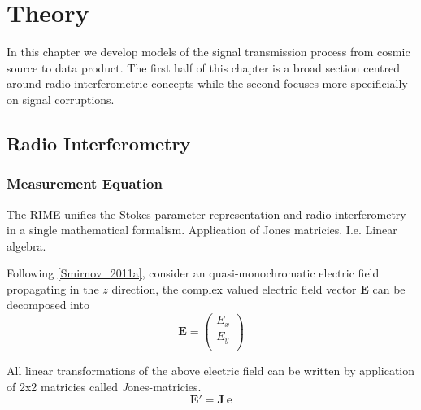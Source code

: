 \chapter{Theory}
In this chapter we develop models of the signal transmission process from cosmic source to data product. The first half of this chapter is a broad section centred around radio interferometric concepts while the second focuses more specificially on signal corruptions. 


\section{Radio Interferometry}




\subsection{Measurement Equation}\label{sec:RIME}

The RIME unifies the Stokes parameter representation and radio interferometry in a single mathematical formalism. Application of Jones matricies. I.e. Linear algebra.


Following \ref{Smirnov_2011a}, consider an quasi-monochromatic electric field propagating in the $z$ direction, the complex valued electric field vector $\mathbf{E}$ can be decomposed into
\begin{equation*}
\mathbf{E} = \left(
\begin{array}{c}
E_x \\
E_y \\
\end{array} \right)
\end{equation*}

All linear transformations of the above electric field can be written by application of 2x2 matricies called {\emph Jones}-matricies.
\begin{equation*}
\mathbf{E'} = \mathbf{J\ e}
\end{equation*}

